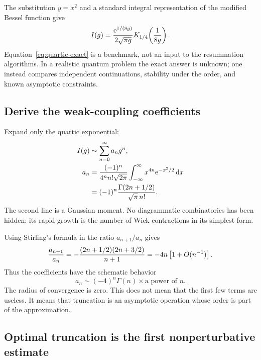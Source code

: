 The substitution $y=x^2$ and a standard integral representation of the
modified Bessel function give
\begin{equation}
  I(g)=\frac{\mathrm{e}^{1/(8g)}}{2\sqrt{\pi g}}
  K_{1/4}\!\left(\frac{1}{8g}\right).
  \label{eq:quartic-exact}
\end{equation}
Equation~\eqref{eq:quartic-exact} is a benchmark, not an input to the
resummation algorithms.  In a realistic quantum problem the exact answer is
unknown; one instead compares independent continuations, stability under the
order, and known asymptotic constraints.

\subsection{Derive the weak-coupling coefficients}
\label{subsec:quartic-coefficients}

Expand only the quartic exponential:
\begin{align}
  I(g)
  &\sim \sum_{n=0}^{\infty}a_n g^n, \\
  a_n
  &=\frac{(-1)^n}{4^n n!\sqrt{2\pi}}
    \int_{-\infty}^{\infty}x^{4n}\mathrm{e}^{-x^2/2}\,\mathrm{d} x \\
  &=(-1)^n\frac{\Gamma(2n+1/2)}{\sqrt{\pi}\,n!}.
  \label{eq:quartic-coefficients}
\end{align}
The second line is a Gaussian moment.  No diagrammatic combinatorics has
been hidden: its rapid growth is the number of Wick contractions in its
simplest form.

Using Stirling's formula in the ratio $a_{n+1}/a_n$ gives
\begin{equation}
  \frac{a_{n+1}}{a_n}
  =-\frac{(2n+1/2)(2n+3/2)}{n+1}
  =-4n\left[1+O(n^{-1})\right].
  \label{eq:quartic-ratio}
\end{equation}
Thus the coefficients have the schematic behavior
\begin{equation}
  a_n\sim (-4)^n\Gamma(n)\times
  \text{a power of }n.
  \label{eq:quartic-large-order}
\end{equation}
The radius of convergence is zero.  This does not mean that the first few
terms are useless.  It means that truncation is an asymptotic operation whose
order is part of the approximation.

\subsection{Optimal truncation is the first nonperturbative estimate}
\label{subsec:optimal-truncation}

